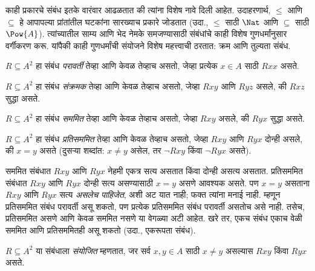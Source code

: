 \documentclass[../../../include/open-logic-section]{subfiles}
\begin{document}

\begin{intro}
काही प्रकारचे संबंध इतके वारंवार आढळतात की त्यांना विशेष नावे दिली
आहेत. उदाहरणार्थ, $\le$ आणि $\subseteq$ हे आपापल्या प्रांतांतील घटकांना
सारख्याच प्रकारे जोडतात (उदा., $\le$ साठी $\Nat$ आणि $\subseteq$ साठी
$\Pow{A}$). त्यांच्यातील साम्य आणि भेद नेमके समजण्यासाठी संबंधांचे काही
विशेष गुणधर्मांनुसार वर्गीकरण करू. यांपैकी काही गुणधर्मांची संयोजने विशेष
महत्त्वाची ठरतात: क्रम आणि तुल्यता संबंध.
\end{intro}

\begin{defn}[परावर्तिता]
$R \subseteq A^2$ हा संबंध \emph{परावर्ती} तेव्हा आणि केवळ तेव्हाच असतो,
जेव्हा प्रत्येक $x \in A$ साठी $Rxx$ असते.
\end{defn}

\begin{defn}[संक्रमकता]
$R \subseteq A^2$ हा संबंध \emph{संक्रमक} तेव्हा आणि केवळ तेव्हाच असतो,
जेव्हा $Rxy$ आणि $Ryz$ असले, की $Rxz$ सुद्धा असते.
\end{defn}

\begin{defn}[सममिती]
$R \subseteq A^2$ हा संबंध \emph{सममित} तेव्हा आणि केवळ तेव्हाच असतो,
जेव्हा $Rxy$ असले, की $Ryx$ सुद्धा असते.
\end{defn}

\begin{defn}[प्रतिसममिती]
$R \subseteq A^2$ हा संबंध \emph{प्रति\-सम\-मित} तेव्हा आणि केवळ तेव्हाच
असतो, जेव्हा $Rxy$ आणि $Ryx$ दोन्ही असले, की $x=y$ असते (दुसऱ्या शब्दांत:
$x\neq y$ असेल, तर $\lnot Rxy$ किंवा $\lnot Ryx$ असते).
\end{defn}

\begin{explain}
सममित संबंधात $Rxy$ आणि $Ryx$ नेहमी एकत्र सत्य असतात किंवा दोन्ही असत्य
असतात. प्रतिसममित संबंधात $Rxy$ आणि $Ryx$ दोन्ही सत्य असण्यासाठी $x = y$
असणे आवश्यक असते. पण $x = y$ असताना $Rxy$ आणि $Ryx$ सत्य \emph{असलेच
पाहिजेत}, अशी अट यात नाही; फक्त त्यांना मनाई नाही. म्हणून प्रतिसममित
संबंध परावर्ती असू शकतो, पण प्रत्येक प्रतिसममित संबंध परावर्ती असतोच
असे नाही. तसेच, प्रतिसममित असणे आणि केवळ सममित नसणे या वेगळ्या अटी आहेत.
खरे तर, एकच संबंध एकाच वेळी सममित आणि प्रतिसममितही असू शकतो
(उदा., एकरूपता संबंध).
\end{explain}

\begin{defn}[संयोजितता]
$R \subseteq A^2$ या संबंधाला \emph{संयोजित} म्हणतात, जर सर्व $x,y\in A$
साठी $x \neq y$ असल्यास $Rxy$ किंवा $Ryx$ असते.
\end{defn}
\end{document}
